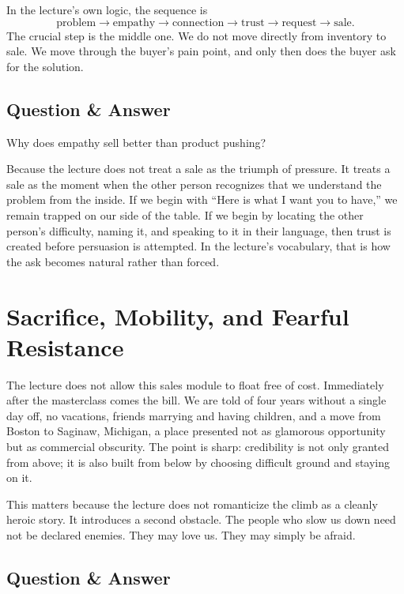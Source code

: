 In the lecture's own logic, the sequence is
\begin{equation}
\text{problem} \to \text{empathy} \to \text{connection} \to \text{trust} \to \text{request} \to \text{sale}.
\end{equation}
The crucial step is the middle one. We do not move directly from inventory to sale. We move through the buyer's pain point, and only then does the buyer ask for the solution.

\subsection{Question \& Answer}

Why does empathy sell better than product pushing?

Because the lecture does not treat a sale as the triumph of pressure. It treats a sale as the moment when the other person recognizes that we understand the problem from the inside. If we begin with ``Here is what I want you to have,'' we remain trapped on our side of the table. If we begin by locating the other person's difficulty, naming it, and speaking to it in their language, then trust is created before persuasion is attempted. In the lecture's vocabulary, that is how the ask becomes natural rather than forced.

\section{Sacrifice, Mobility, and Fearful Resistance}

The lecture does not allow this sales module to float free of cost. Immediately after the masterclass comes the bill. We are told of four years without a single day off, no vacations, friends marrying and having children, and a move from Boston to Saginaw, Michigan, a place presented not as glamorous opportunity but as commercial obscurity. The point is sharp: credibility is not only granted from above; it is also built from below by choosing difficult ground and staying on it.

This matters because the lecture does not romanticize the climb as a cleanly heroic story. It introduces a second obstacle. The people who slow us down need not be declared enemies. They may love us. They may simply be afraid.

\subsection{Question \& Answer}

